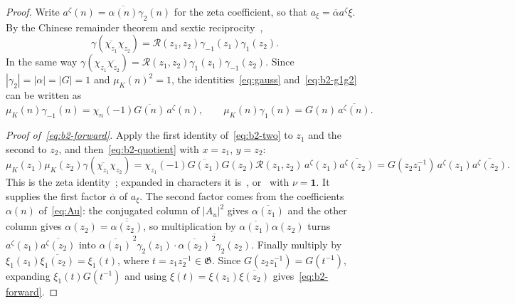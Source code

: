 \documentclass[11pt]{article}
\numberwithin{equation}{section}
\newcommand{\muk}{\mu_K}
\begin{document}
\begin{proof}
Write $a^\zeta(n)=\overline{\alpha(n)}\gamma_2(n)$ for the zeta coefficient, so that
$a_\xi=\overline\alpha a^\zeta\xi$. By the Chinese remainder theorem and sextic
reciprocity~\cite[(4.27)]{QF},
\begin{equation}\label{eq:b2-crt}
 \gamma(\overline{\chi_{z_1}}\chi_{z_2})
 =\mathcal R(z_1,z_2)\gamma_{-1}(z_1)\gamma_1(z_2).
\end{equation}
In the same way
$\gamma(\chi_{z_1}\overline{\chi_{z_2}})=\mathcal R(z_1,z_2)\gamma_1(z_1)\gamma_{-1}(z_2)$.
Since $|\gamma_2|=|\alpha|=|G|=1$ and $\muk(n)^2=1$, the identities~\eqref{eq:gauss}
and~\eqref{eq:b2-g1g2} can be written as
\begin{equation}\label{eq:b2-two}
 \muk(n)\gamma_{-1}(n)=\chi_n(-1)\overline{G(n)}\,a^\zeta(n),\qquad
 \muk(n)\gamma_1(n)=G(n)\,\overline{a^\zeta(n)}.
\end{equation}

\emph{Proof of~\eqref{eq:b2-forward}.} Apply the first identity of~\eqref{eq:b2-two} to
$z_1$ and the second to $z_2$, and then~\eqref{eq:b2-quotient} with $x=z_1$, $y=z_2$:
\begin{equation}\label{eq:d040}
 \muk(z_1)\muk(z_2)\gamma(\overline{\chi_{z_1}}\chi_{z_2})
 =\chi_{z_1}(-1)\overline{G(z_1)}G(z_2)\mathcal R(z_1,z_2)\,
  a^\zeta(z_1)\overline{a^\zeta(z_2)}
 =G(z_2z_1^{-1})\,a^\zeta(z_1)\overline{a^\zeta(z_2)}.
\end{equation}
This is the zeta identity~\cite[(4.28)]{QF}; expanded in characters it
is~\cite[(6.8)]{ZG}, or~\cite[(4.15)]{OAI1112} with $\nu=\mathbf1$.
It supplies the first factor $\overline\alpha$ of $a_\xi$. The second factor comes from the
coefficients $\alpha(n)$ of~\eqref{eq:Au}: the conjugated column of $|A_u|^2$ gives
$\overline{\alpha(z_1)}$ and the other column gives
$\alpha(z_2)=\overline{\overline{\alpha(z_2)}}$, so multiplication by
$\overline{\alpha(z_1)}\alpha(z_2)$ turns $a^\zeta(z_1)\overline{a^\zeta(z_2)}$ into
$\overline{\alpha(z_1)}^{\,2}\gamma_2(z_1)\cdot\overline{\overline{\alpha(z_2)}^{\,2}\gamma_2(z_2)}$.
Finally multiply by $\xi_1(z_1)\overline{\xi_1(z_2)}=\xi_1(t)$, where
$t=z_1z_2^{-1}\in\mathfrak G$. Since $G(z_2z_1^{-1})=G(t^{-1})$, expanding
$\xi_1(t)G(t^{-1})$ and using $\xi(t)=\xi(z_1)\overline{\xi(z_2)}$
gives~\eqref{eq:b2-forward}.


\end{proof}
\end{document}
